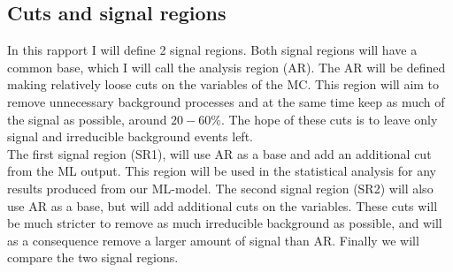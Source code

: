\documentclass{article}
\begin{document}
\subsection{Cuts and signal regions}
In this rapport I will define 2 signal regions. Both signal regions will have a common base, which I will call the analysis region (AR). The AR will be defined making relatively loose cuts on the variables of the MC. This region will aim to remove unnecessary background processes and at the same time keep as much of the signal as possible, around $20-60\%$. The hope of these cuts is to leave only signal and irreducible background events left.
\\
The first signal region (SR1), will use AR as a base and add an additional cut from the ML output.  This region will be used in the statistical analysis for any results produced from our ML-model. The second signal region (SR2) will also use AR as a base, but will add additional cuts on the variables. These cuts will be much stricter to remove as much irreducible background as possible, and will as a consequence remove a larger amount of signal than AR. Finally we will compare the two signal regions.
\end{document}
